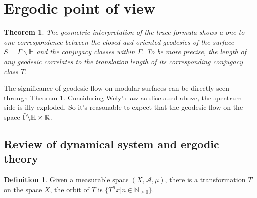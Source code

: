 \documentclass[12pt,a4paper,english]{article}
\theoremstyle{plain}
\newtheorem{thm}{Theorem}[section]
\theoremstyle{definition}
\newtheorem{defi}{Definition}
\theoremstyle{remark}
\begin{document}
\section{Ergodic point of view}

\begin{thm}\label{geodesictoconjugacy}
   The geometric interpretation of the trace formula shows a one-to-one correspondence between the closed and oriented geodesics of the surface $S=\Gamma\backslash \mathbb{H}$ and the conjugacy classes within $\Gamma$. To be more precise, the length of any geodesic correlates to the translation length of its corresponding conjugacy class ${T}$. 
\end{thm}

The significance of geodesic flow on modular surfaces can be directly seen through Theorem \ref{geodesictoconjugacy}. Considering Wely's law as discussed above, the spectrum side is illy exploded. So it's reasonable to expect that the geodesic flow on the space $\Tilde{\Gamma}\backslash \mathbb{H}\times \mathbb{R}$.

\subsection{Review of dynamical system and ergodic theory}

\begin{defi}
    Given a measurable space $(X,\mathcal{A},\mu)$, there is a transformation $T$ on the space $X$, the orbit of $T$ is $\{T^{n}x|n\in\mathbb{N}_{\geq0}\}$.
\end{defi}

\newpage


\end{document}
